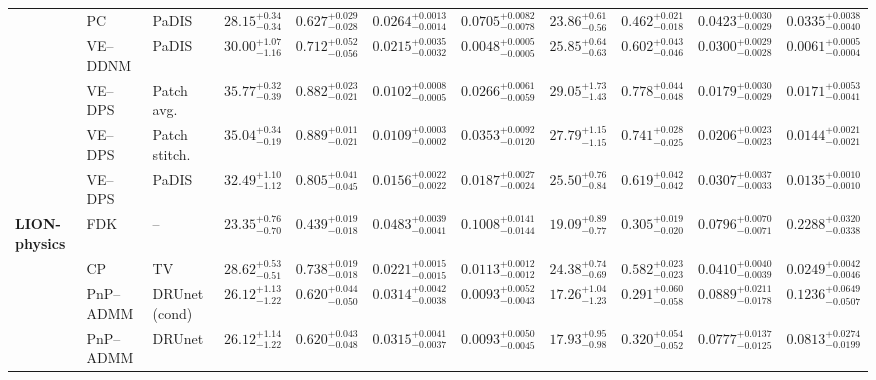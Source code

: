 \begin{landscape}
\begin{table}[p]
{\begin{tabular}{lllcccccccc}
 & PC & PaDIS & $28.15^{+0.34}_{-0.34}$ & $0.627^{+0.029}_{-0.028}$ & $0.0264^{+0.0013}_{-0.0014}$ & $0.0705^{+0.0082}_{-0.0078}$ & $23.86^{+0.61}_{-0.56}$ & $0.462^{+0.021}_{-0.018}$ & $0.0423^{+0.0030}_{-0.0029}$ & $0.0335^{+0.0038}_{-0.0040}$ \\
 & VE--DDNM & PaDIS & $30.00^{+1.07}_{-1.16}$ & $0.712^{+0.052}_{-0.056}$ & $0.0215^{+0.0035}_{-0.0032}$ & $0.0048^{+0.0005}_{-0.0005}$ & $25.85^{+0.64}_{-0.63}$ & $0.602^{+0.043}_{-0.046}$ & $0.0300^{+0.0029}_{-0.0028}$ & $0.0061^{+0.0005}_{-0.0004}$ \\
 & VE--DPS & Patch avg. & $35.77^{+0.32}_{-0.39}$ & $0.882^{+0.023}_{-0.021}$ & $0.0102^{+0.0008}_{-0.0005}$ & $0.0266^{+0.0061}_{-0.0059}$ & $29.05^{+1.73}_{-1.43}$ & $0.778^{+0.044}_{-0.048}$ & $0.0179^{+0.0030}_{-0.0029}$ & $0.0171^{+0.0053}_{-0.0041}$ \\
 & VE--DPS & Patch stitch. & $35.04^{+0.34}_{-0.19}$ & $0.889^{+0.011}_{-0.021}$ & $0.0109^{+0.0003}_{-0.0002}$ & $0.0353^{+0.0092}_{-0.0120}$ & $27.79^{+1.15}_{-1.15}$ & $0.741^{+0.028}_{-0.025}$ & $0.0206^{+0.0023}_{-0.0023}$ & $0.0144^{+0.0021}_{-0.0021}$ \\
 & VE--DPS & PaDIS & $32.49^{+1.10}_{-1.12}$ & $0.805^{+0.041}_{-0.045}$ & $0.0156^{+0.0022}_{-0.0022}$ & $0.0187^{+0.0027}_{-0.0024}$ & $25.50^{+0.76}_{-0.84}$ & $0.619^{+0.042}_{-0.042}$ & $0.0307^{+0.0037}_{-0.0033}$ & $0.0135^{+0.0010}_{-0.0010}$ \\
\addlinespace[2pt]\midrule
\textbf{LION-physics} & FDK & -- & $23.35^{+0.76}_{-0.70}$ & $0.439^{+0.019}_{-0.018}$ & $0.0483^{+0.0039}_{-0.0041}$ & $0.1008^{+0.0141}_{-0.0144}$ & $19.09^{+0.89}_{-0.77}$ & $0.305^{+0.019}_{-0.020}$ & $0.0796^{+0.0070}_{-0.0071}$ & $0.2288^{+0.0320}_{-0.0338}$ \\
 & CP & TV & $28.62^{+0.53}_{-0.51}$ & $0.738^{+0.019}_{-0.018}$ & $0.0221^{+0.0015}_{-0.0015}$ & $0.0113^{+0.0012}_{-0.0012}$ & $24.38^{+0.74}_{-0.69}$ & $0.582^{+0.023}_{-0.023}$ & $0.0410^{+0.0040}_{-0.0039}$ & $0.0249^{+0.0042}_{-0.0046}$ \\
 & PnP--ADMM & DRUnet (cond) & $26.12^{+1.13}_{-1.22}$ & $0.620^{+0.044}_{-0.050}$ & $0.0314^{+0.0042}_{-0.0038}$ & $0.0093^{+0.0052}_{-0.0043}$ & $17.26^{+1.04}_{-1.23}$ & $0.291^{+0.060}_{-0.058}$ & $0.0889^{+0.0211}_{-0.0178}$ & $0.1236^{+0.0649}_{-0.0507}$ \\
 & PnP--ADMM & DRUnet & $26.12^{+1.14}_{-1.22}$ & $0.620^{+0.043}_{-0.048}$ & $0.0315^{+0.0041}_{-0.0037}$ & $0.0093^{+0.0050}_{-0.0045}$ & $17.93^{+0.95}_{-0.98}$ & $0.320^{+0.054}_{-0.052}$ & $0.0777^{+0.0137}_{-0.0125}$ & $0.0813^{+0.0274}_{-0.0199}$ \\

\end{tabular}}
\end{table}
\end{landscape}
